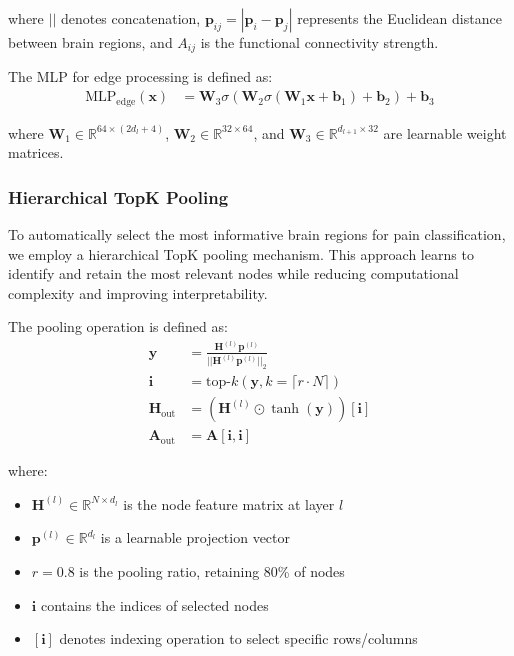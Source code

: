 \documentclass[10pt,journal,compsoc]{IEEEtran}
\begin{document}
where $||$ denotes concatenation, $\mathbf{p}_{ij} = |\mathbf{p}_i - \mathbf{p}_j|$ represents the Euclidean distance between brain regions, and $A_{ij}$ is the functional connectivity strength.

The MLP for edge processing is defined as:
\begin{align}
\text{MLP}_{\text{edge}}(\mathbf{x}) &= \mathbf{W}_3 \sigma(\mathbf{W}_2 \sigma(\mathbf{W}_1 \mathbf{x} + \mathbf{b}_1) + \mathbf{b}_2) + \mathbf{b}_3
\end{align}

where $\mathbf{W}_1 \in \mathbb{R}^{64 \times (2d_l + 4)}$, $\mathbf{W}_2 \in \mathbb{R}^{32 \times 64}$, and $\mathbf{W}_3 \in \mathbb{R}^{d_{l+1} \times 32}$ are learnable weight matrices.

\subsubsection{Hierarchical TopK Pooling}

To automatically select the most informative brain regions for pain classification, we employ a hierarchical TopK pooling mechanism. This approach learns to identify and retain the most relevant nodes while reducing computational complexity and improving interpretability.

The pooling operation is defined as:
\begin{align}
\mathbf{y} &= \frac{\mathbf{H}^{(l)} \mathbf{p}^{(l)}}{||\mathbf{H}^{(l)} \mathbf{p}^{(l)}||_2} \\
\mathbf{i} &= \text{top-}k(\mathbf{y}, k = \lceil r \cdot N \rceil) \\
\mathbf{H}_{\text{out}} &= (\mathbf{H}^{(l)} \odot \tanh(\mathbf{y}))[\mathbf{i}] \\
\mathbf{A}_{\text{out}} &= \mathbf{A}[\mathbf{i}, \mathbf{i}]
\end{align}

where:
\begin{itemize}
\item $\mathbf{H}^{(l)} \in \mathbb{R}^{N \times d_l}$ is the node feature matrix at layer $l$
\item $\mathbf{p}^{(l)} \in \mathbb{R}^{d_l}$ is a learnable projection vector
\item $r = 0.8$ is the pooling ratio, retaining 80\% of nodes
\item $\mathbf{i}$ contains the indices of selected nodes
\item $[\mathbf{i}]$ denotes indexing operation to select specific rows/columns
\end{itemize}
\end{document}
